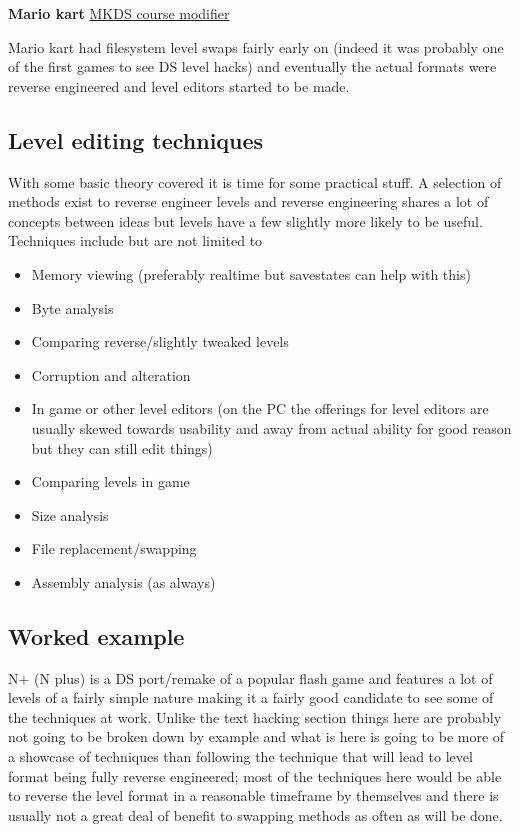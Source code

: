 \documentclass[
]{book}
\providecommand{\tightlist}{%
  \setlength{\itemsep}{0pt}\setlength{\parskip}{0pt}}
\begin{document}
\textbf{Mario kart} \href{http://gbatemp.net/topic/299444-mkds-course-modifier/}{MKDS course modifier}

Mario kart had filesystem level swaps fairly early on (indeed it was probably one of the first games to see DS level hacks) and eventually the actual formats were reverse engineered and level editors started to be made.

\hypertarget{level-editing-techniques}{%
\subsection{Level editing techniques}\label{level-editing-techniques}}

With some basic theory covered it is time for some practical stuff. A selection of methods exist to reverse engineer levels and reverse engineering shares a lot of concepts between ideas but levels have a few slightly more likely to be useful. Techniques include but are not limited to

\begin{itemize}
\tightlist
\item
  Memory viewing (preferably realtime but savestates can help with this)
\item
  Byte analysis
\item
  Comparing reverse/slightly tweaked levels
\item
  Corruption and alteration
\item
  In game or other level editors (on the PC the offerings for level editors are usually skewed towards usability and away from actual ability for good reason but they can still edit things)
\item
  Comparing levels in game
\item
  Size analysis
\item
  File replacement/swapping
\item
  Assembly analysis (as always)
\end{itemize}

\hypertarget{worked-example-1}{%
\subsection{Worked example}\label{worked-example-1}}

N+ (N plus) is a DS port/remake of a popular flash game and features a lot of levels of a fairly simple nature making it a fairly good candidate to see some of the techniques at work. Unlike the text hacking section things here are probably not going to be broken down by example and what is here is going to be more of a showcase of techniques than following the technique that will lead to level format being fully reverse engineered; most of the techniques here would be able to reverse the level format in a reasonable timeframe by themselves and there is usually not a great deal of benefit to swapping methods as often as will be done.
\end{document}
